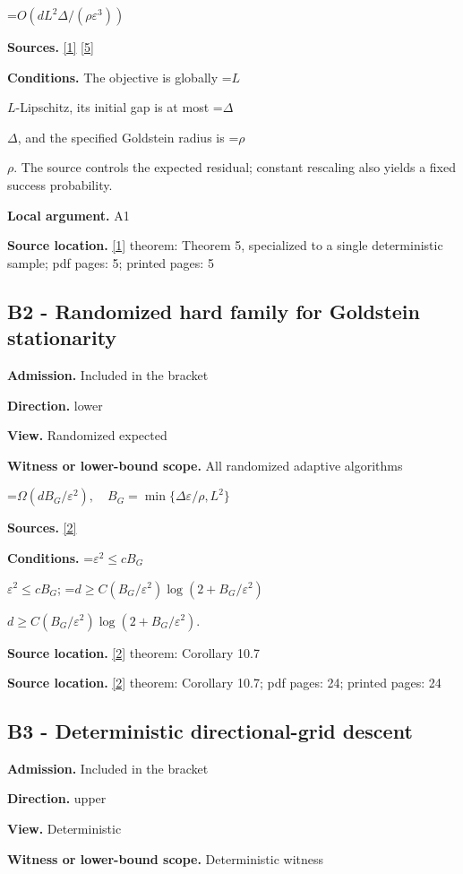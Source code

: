 \documentclass[10pt,a4paper]{article}
\newcommand{\AtlasMath}[1]{\par\begingroup\centering\setbox0=\hbox{$\displaystyle #1$}\ifdim\wd0>1.4\linewidth\typeout{ATLAS WIDE FORMULA: \the\wd0}\fi\ifdim\wd0>\linewidth\resizebox{\linewidth}{!}{\box0}\else\box0\fi\par\endgroup}
\newcommand{\AtlasInlineMath}[1]{\begingroup\setbox0=\hbox{$#1$}\ifdim\wd0>.4\linewidth\endgroup\AtlasMath{#1}\else\endgroup$#1$\fi}
\begin{document}
\AtlasMath{O(dL^2\Delta/(\rho\varepsilon^3))}
\textbf{Sources.} \href{https://www.jmlr.org/papers/volume25/23-1159/23-1159.pdf}{[1]} \href{https://arxiv.org/html/2610.00275v2}{[5]}

\textbf{Conditions.} The objective is globally \AtlasInlineMath{L}-Lipschitz, its initial gap is at most \AtlasInlineMath{\Delta}, and the specified Goldstein radius is \AtlasInlineMath{\rho}. The source controls the expected residual; constant rescaling also yields a fixed success probability.

\textbf{Local argument.} A1

\textbf{Source location.} \href{https://www.jmlr.org/papers/volume25/23-1159/23-1159.pdf}{[1]} theorem: Theorem 5, specialized to a single deterministic sample; pdf pages: 5; printed pages: 5

\subsection{B2 - Randomized hard family for Goldstein stationarity}
\textbf{Admission.} Included in the bracket

\textbf{Direction.} lower

\textbf{View.} Randomized expected

\textbf{Witness or lower-bound scope.} All randomized adaptive algorithms

\AtlasMath{\Omega(dB_G/\varepsilon^2),\quad B_G=\min\{\Delta\varepsilon/\rho,L^2\}}
\textbf{Sources.} \href{https://arxiv.org/html/2610.19652v1}{[2]}

\textbf{Conditions.} \AtlasInlineMath{\varepsilon^2\le cB_G}; \AtlasInlineMath{d\ge C(B_G/\varepsilon^2)\log(2+B_G/\varepsilon^2)}.

\textbf{Source location.} \href{https://arxiv.org/html/2610.19652v1}{[2]} theorem: Corollary 10.7

\textbf{Source location.} \href{https://arxiv.org/html/2610.19652v1}{[2]} theorem: Corollary 10.7; pdf pages: 24; printed pages: 24

\subsection{B3 - Deterministic directional-grid descent}
\textbf{Admission.} Included in the bracket

\textbf{Direction.} upper

\textbf{View.} Deterministic

\textbf{Witness or lower-bound scope.} Deterministic witness
\end{document}
